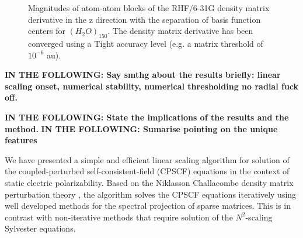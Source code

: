 \documentclass[prl,aps,twocolumn,showpacs,twocolumngrid,superbib]{revtex4}
\begin{document}
\begin{figure}
  \caption{\protect
    Magnitudes of atom-atom blocks of the RHF/6-31G density matrix derivative
    in the z direction with the separation of basis function centers for $(H_2O)_{150}$.
    The density matrix derivative has been converged using a Tight accuracy level (e.g. 
    a matrix threshold of $10^{-6}$ au).
  }\label{fig:DPrimeZ_150_6-31G}
\end{figure}


{\bf IN THE FOLLOWING: Say smthg about the results briefly: linear scaling onset, numerical stability, 
numerical thresholding no radial fuck off.}


{\bf IN THE FOLLOWING: State the implications of the results and the method.}
{\bf IN THE FOLLOWING: Sumarise pointing on the unique features}

We have presented a simple and efficient linear scaling algorithm for 
solution of the coupled-perturbed self-consistent-field (CPSCF) equations 
in the context of static electric polarizability.  Based on the 
Niklasson Challacombe density matrix perturbation theory \cite{}, the 
algorithm solves the CPSCF equations iteratively using well developed
methods for the spectral projection of sparse matrices.  This is in contrast 
with non-iterative methods that require solution of the $N^2$-scaling 
Sylvester equations. 
\end{document}
